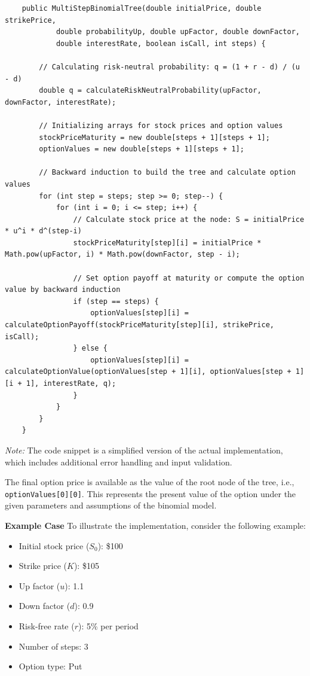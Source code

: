 \documentclass{article}
\begin{document}
    \small
    \begin{verbatim}
    public MultiStepBinomialTree(double initialPrice, double strikePrice,
            double probabilityUp, double upFactor, double downFactor,
            double interestRate, boolean isCall, int steps) {

        // Calculating risk-neutral probability: q = (1 + r - d) / (u - d)
        double q = calculateRiskNeutralProbability(upFactor, downFactor, interestRate);

        // Initializing arrays for stock prices and option values
        stockPriceMaturity = new double[steps + 1][steps + 1];
        optionValues = new double[steps + 1][steps + 1];

        // Backward induction to build the tree and calculate option values
        for (int step = steps; step >= 0; step--) {
            for (int i = 0; i <= step; i++) {
                // Calculate stock price at the node: S = initialPrice * u^i * d^(step-i)
                stockPriceMaturity[step][i] = initialPrice * Math.pow(upFactor, i) * Math.pow(downFactor, step - i);

                // Set option payoff at maturity or compute the option value by backward induction
                if (step == steps) {
                    optionValues[step][i] = calculateOptionPayoff(stockPriceMaturity[step][i], strikePrice, isCall);
                } else {
                    optionValues[step][i] = calculateOptionValue(optionValues[step + 1][i], optionValues[step + 1][i + 1], interestRate, q);
                }
            }
        }
    }
    \end{verbatim}

    \normalsize

    \emph{Note:} The code snippet is a simplified version of the actual implementation, which includes additional error handling and input validation.

    \medbreak

    The final option price is available as the value of the root node of the tree, i.e., \texttt{optionValues[0][0]}. This represents the present value of the option under the given parameters and assumptions of the binomial model.

    \medbreak

    \textbf{Example Case}
    To illustrate the implementation, consider the following example:

    \begin{itemize}
        \item Initial stock price (\( S_0 \)): \$100
        \item Strike price (\( K \)): \$105
        \item Up factor (\( u \)): 1.1
        \item Down factor (\( d \)): 0.9
        \item Risk-free rate (\( r \)): 5\% per period
        \item Number of steps: 3
        \item Option type: Put
    \end{itemize}
\end{document}
